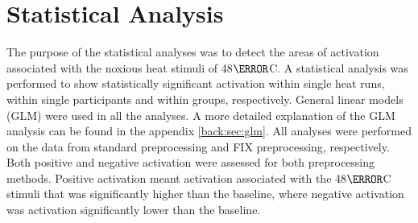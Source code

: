 \section{Statistical Analysis}\label{sec:stats}

The purpose of the statistical analyses was to detect the areas of activation associated with the noxious heat stimuli of 48$\degree$C. A statistical analysis was performed to show statistically significant activation within single heat runs, within single participants and within groups, respectively. General linear models (GLM) were used in all the analyses. A more detailed explanation of the GLM analysis can be found in the appendix \ref{back:sec:glm}. All analyses were performed on the data from standard preprocessing and FIX preprocessing, respectively. Both positive and negative activation were assessed for both preprocessing methods. Positive activation meant activation associated with the 48$\degree$C stimuli that was significantly higher than the baseline, where negative activation was activation significantly lower than the baseline.

